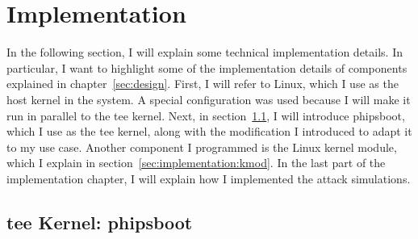 \chapter{Implementation}
\label{sec:implementation}


In the following section, I will explain some technical implementation details.
In particular, I want to highlight some of the implementation details of
components explained in chapter~\ref{sec:design}. First, I will refer to Linux,
which I use as the host kernel in the system. A special configuration was used
because I will make it run in parallel to the \gls{tee} kernel. Next, in
section~\ref{sec:implementation:teeKernel}, I will introduce phipsboot, which I
use as the \gls{tee} kernel, along with the modification I introduced to adapt
it to my use case. Another component I programmed is the Linux kernel module,
which I explain in section~\ref{sec:implementation:kmod}. In the last part of
the implementation chapter, I will explain how I implemented the attack
simulations.

\section{\gls{tee} Kernel: phipsboot}
\label{sec:implementation:teeKernel}

